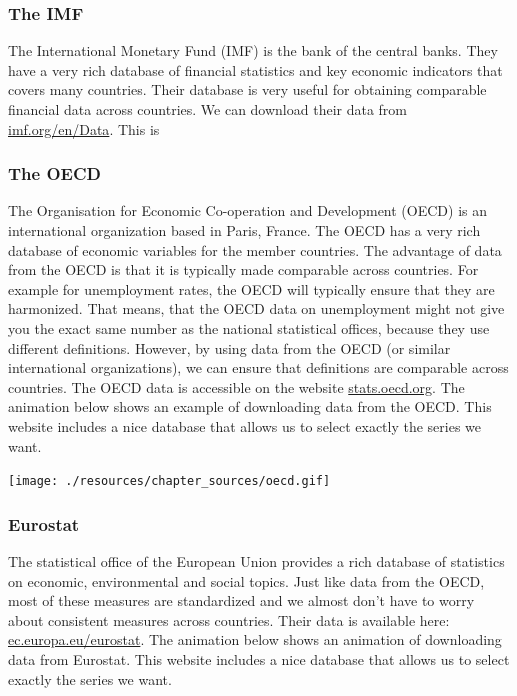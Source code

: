 \documentclass[
]{book}
\begin{document}
\hypertarget{the-imf}{%
\subsubsection*{The IMF}\label{the-imf}}

The International Monetary Fund (IMF) is the bank of the central banks. They have a very rich database of financial statistics and key economic indicators that covers many countries. Their database is very useful for obtaining comparable financial data across countries. We can download their data from \href{https://www.imf.org/en/Data}{imf.org/en/Data}. This is

\hypertarget{the-oecd}{%
\subsubsection*{The OECD}\label{the-oecd}}

The Organisation for Economic Co-operation and Development (OECD) is an international organization based in Paris, France. The OECD has a very rich database of economic variables for the member countries. The advantage of data from the OECD is that it is typically made comparable across countries. For example for unemployment rates, the OECD will typically ensure that they are harmonized. That means, that the OECD data on unemployment might not give you the exact same number as the national statistical offices, because they use different definitions. However, by using data from the OECD (or similar international organizations), we can ensure that definitions are comparable across countries.
The OECD data is accessible on the website \href{https://stats.oecd.org}{stats.oecd.org}. The animation below shows an example of downloading data from the OECD. This website includes a nice database that allows us to select exactly the series we want.

\texttt{[image: ./resources/chapter\_sources/oecd.gif]}

\hypertarget{eurostat}{%
\subsubsection*{Eurostat}\label{eurostat}}

The statistical office of the European Union provides a rich database of statistics on economic, environmental and social topics. Just like data from the OECD, most of these measures are standardized and we almost don't have to worry about consistent measures across countries. Their data is available here: \href{https://ec.europa.eu/eurostat/web/main/home}{ec.europa.eu/eurostat}. The animation below shows an animation of downloading data from Eurostat. This website includes a nice database that allows us to select exactly the series we want.
\end{document}
